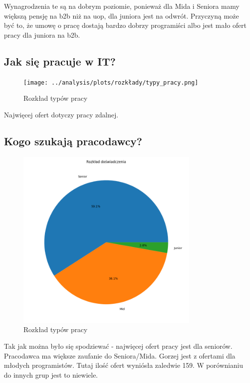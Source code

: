 \documentclass[a4paper]{article}
\begin{document}
\quad Wynagrodzenia te są na dobrym poziomie, ponieważ dla Mida i Seniora mamy większą pensję na b2b niż na uop, dla juniora jest na odwrót. Przyczyną może być to, że umowę o pracę dostają bardzo dobrzy programiści albo jest mało ofert pracy dla juniora na b2b.


\newpage
\subsection{Jak się pracuje w IT?}

\begin{figure}[H]
    \centering
    \texttt{[image: ../analysis/plots/rozkłady/typy\_pracy.png]}
    \caption{Rozkład typów pracy}
\end{figure}

\quad Najwięcej ofert dotyczy pracy zdalnej.


\subsection{Kogo szukają pracodawcy?}

\begin{figure}[H]
    \centering
    \includegraphics[width=0.8\textwidth]{../analysis/plots/rozkłady/rozkład_doświadczenia.png}
    \caption{Rozkład typów pracy}
\end{figure}

\quad Tak jak można było się spodziewać - najwięcej ofert pracy jest dla seniorów. Pracodawca ma większe zaufanie do Seniora/Mida. Gorzej jest z ofertami dla młodych programistów.
Tutaj ilość ofert wyniósła zaledwie 159. W porównianiu do innych grup jest to niewiele.
\end{document}
